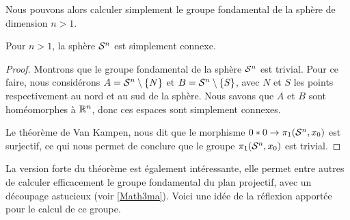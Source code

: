 Nous pouvons alors calculer simplement le groupe fondamental de la sphère de dimension $n>1$.

\begin{proposition}
Pour $n>1$, la sphère $\mathcal{S}^{n}$ est simplement connexe.
\end{proposition}
\begin{proof}
Montrons que le groupe fondamental de la sphère $\mathcal{S}^{n}$ est trivial. Pour ce faire, nous considérons $A=\mathcal{S}^{n}\setminus\{N\}$ et $B=\mathcal{S}^{n}\setminus\{S\}$, avec $N$ et $S$ les points respectivement au nord et au sud de la sphère. Nous savons que $A$ et $B$ sont homéomorphes à $\mathbb{R}^n$, donc ces espaces sont simplement connexes.

Le théorème de Van Kampen, nous dit que le morphisme $0\ast0\to\pi_1(\mathcal{S}^{n},x_0)$ est surjectif, ce qui nous permet de conclure que le groupe $\pi_1(\mathcal{S}^{n},x_0)$ est trivial.
\end{proof}

La version forte du théorème est également intéressante, elle permet entre autres de calculer efficacement le groupe fondamental du plan projectif, avec un découpage astucieux (voir \href{https://www.math3ma.com/blog/the-fundamental-group-of-the-real-projective-plane}{[Math3ma]}). Voici une idée de la réflexion apportée pour le calcul de ce groupe.

